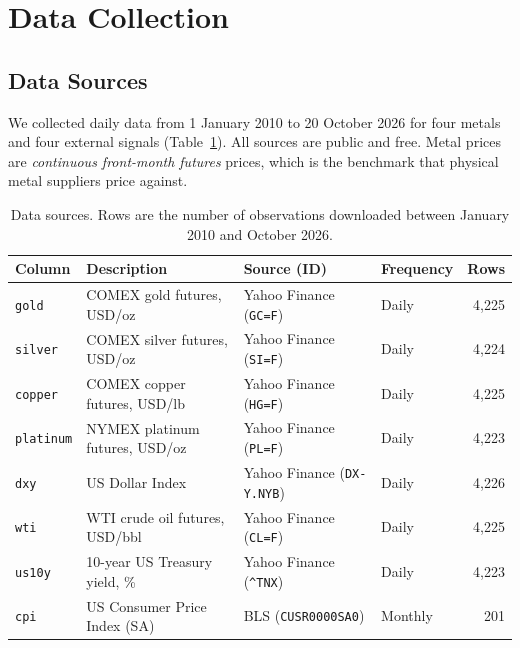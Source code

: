 \section{Data Collection}
\label{sec:collection}

\subsection{Data Sources}

We collected daily data from 1 January 2010 to 20 October 2026 for four metals
and four external signals (Table~\ref{tab:sources}). All sources are public and
free. Metal prices are \emph{continuous front-month futures} prices, which is
the benchmark that physical metal suppliers price against.

\begin{table}[H]
  \centering
  \small
  \begin{tabular}{llllr}
    \toprule
    Column & Description & Source (ID) & Frequency & Rows \\
    \midrule
    \texttt{gold}     & COMEX gold futures, USD/oz       & Yahoo Finance (\texttt{GC=F})      & Daily   & 4,225 \\
    \texttt{silver}   & COMEX silver futures, USD/oz     & Yahoo Finance (\texttt{SI=F})      & Daily   & 4,224 \\
    \texttt{copper}   & COMEX copper futures, USD/lb     & Yahoo Finance (\texttt{HG=F})      & Daily   & 4,225 \\
    \texttt{platinum} & NYMEX platinum futures, USD/oz   & Yahoo Finance (\texttt{PL=F})      & Daily   & 4,223 \\
    \texttt{dxy}      & US Dollar Index                  & Yahoo Finance (\texttt{DX-Y.NYB}) & Daily   & 4,226 \\
    \texttt{wti}      & WTI crude oil futures, USD/bbl   & Yahoo Finance (\texttt{CL=F})      & Daily   & 4,225 \\
    \texttt{us10y}    & 10-year US Treasury yield, \%    & Yahoo Finance (\texttt{\textasciicircum TNX}) & Daily & 4,223 \\
    \texttt{cpi}      & US Consumer Price Index (SA)     & BLS (\texttt{CUSR0000SA0})         & Monthly & 201 \\
    \bottomrule
  \end{tabular}
  \caption{Data sources. Rows are the number of observations downloaded
           between January 2010 and October 2026.}
  \label{tab:sources}
\end{table}


